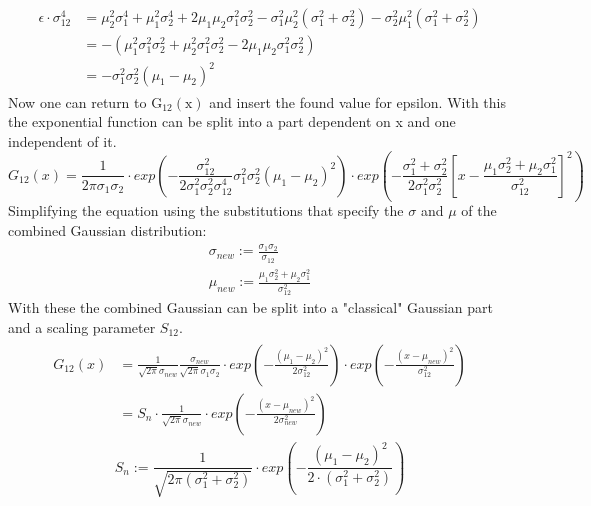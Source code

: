 \documentclass[twoside,openright]{scrreprt}
\begin{document}
{\begin{gather*}
\begin{split}
\epsilon \cdot \sigma_{12}^4  & = \mu_2^2\sigma_1^4 + \mu_1^2\sigma_2^4 + 2\mu_1\mu_2\sigma_1^2\sigma_2^2 - \sigma_1^2\mu_2^2(\sigma_1^2+ \sigma_2^2) - \sigma_2^2\mu_1^2(\sigma_1^2+ \sigma_2^2)\\
& = - (\mu_1^2\sigma_1^2\sigma_2^2 + \mu_2^2\sigma_1^2\sigma_2^2 - 2 \mu_1\mu_2\sigma_1^2\sigma_2^2)\\
& = - \sigma_1^2\sigma_2^2(\mu_1-\mu_2)^2
\end{split}
\end{gather*}
Now one can return to $\mathrm{G_{12}(x)}$ and insert the found value for epsilon. With this the exponential function can be split into a part dependent on x and one independent of it.
\begin{equation*}
G_{12}(x) = \frac{1}{2\pi\sigma_1\sigma_2}\cdot exp\left(- \frac{\sigma_{12}^2}{2\sigma_1^2\sigma_2^2\sigma_{12}^4}\sigma_1^2\sigma_2^2\left(\mu_1-\mu_2\right)^2
\right) \cdot
exp\left(-\frac{\sigma_1^2+\sigma_2^2}{2\sigma_1^2\sigma_2^2} \left[x - \frac{\mu_1\sigma_2^2+\mu_2\sigma_1^2}{\sigma_{12}^2}\right]^2 \right)
\end{equation*}
Simplifying the equation using the substitutions that specify the $\sigma$ and $\mu$ of the combined Gaussian distribution:
\begin{gather*}
\sigma_{new} := \frac{\sigma_1\sigma_2}{\sigma_{12}}\\
\mu_{new} := \frac{\mu_1\sigma_2^2+ \mu_2\sigma_1^2}{\sigma_{12}^2}
\end{gather*}
With these the combined Gaussian can be split into a "classical" Gaussian part and a scaling parameter $S_{12}$.
\begin{gather*}
\begin{split}
G_{12}(x) & = \frac{1}{\sqrt{2\pi}\sigma_{new}}\frac{\sigma_{new}}{\sqrt{2\pi}\sigma_1\sigma_2}\cdot exp\left(- \frac{\left(\mu_1-\mu_2\right)^2}{2\sigma_{12}^2}\right) \cdot
exp\left(-\frac{\left(x-\mu_{new}\right)^2}{\sigma_{12}^2}\right)\\
& = S_n \cdot \frac{1}{\sqrt{2\pi}\sigma_{new}} \cdot exp\left(-\frac{\left(x-\mu_{new}\right)^2}{2\sigma_{new}^2}\right)
\end{split}
\end{gather*}
\begin{equation*}
S_{n} := \dfrac{1}{\sqrt{2\pi\left(\sigma_1^2+\sigma_2^2\right)}}\cdot exp\left(-\dfrac{\left(\mu_1 - \mu_2\right)^2}{2\cdot \left(\sigma_1^2+\sigma_2^2\right)}\right)
\end{equation*}

}
\end{document}
